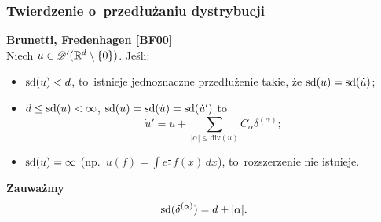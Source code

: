 \documentclass[10pt,t]{beamer}
\newcommand{\divDegree}{\textrm{div}}
\begin{document}
\begin{frame}
  \frametitle{Twierdzenie o~przedłużaniu dystrybucji}


  \textbf{Brunetti, Fredenhagen [BF00]} \\
  Niech $u \in \mathcal{D}'( \mathbb{R}^{ d } \setminus \{ 0 \} )$. Jeśli:
  \begin{itemize}

  \item $\textrm{sd}( u ) < d$, to~istnieje jednoznaczne przedłużenie
    takie, że $\textrm{sd}( u ) = \textrm{sd}( \dot{ u } )$;

  \item $d \leq \textrm{sd}( u ) < \infty$,
    $\textrm{sd}( u ) = \textrm{sd}( \dot{ u } ) = \textrm{sd}( \dot{ u }' )$ to
    \begin{equation}
      \label{eq:Epstein-Glaser-04}
      \dot{ u }' =
      \dot{ u } + \sum\limits_{ | \alpha | \leq \divDegree( u ) } C_{ \alpha } \delta^{ ( \alpha ) };
    \end{equation}

  \item $\textrm{sd}( u ) = \infty$
    (np.~$u( f ) = \int e^{ \frac{ 1 }{ x } } f( x ) \, dx$),
    to~rozszerzenie nie istnieje.

  \end{itemize}

  \vspace{\spaceFour}



  \textbf{Zauważmy}
  \begin{equation}
    \label{eq:Epstein-Glaser-05}
    \textrm{sd}( \delta^{ ( \alpha ) } ) = d + | \alpha |.
  \end{equation}

\end{frame}
\end{document}
